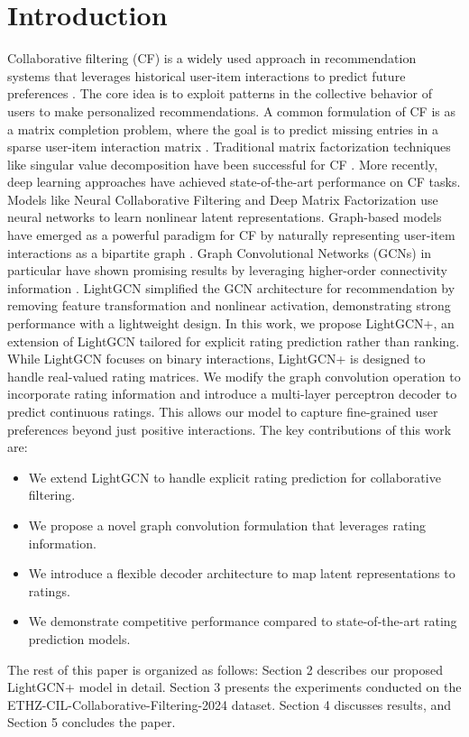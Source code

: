 \documentclass[10pt,conference,compsocconf]{IEEEtran}
\begin{document}
\section{Introduction}
Collaborative filtering (CF) is a widely used approach in recommendation systems that leverages historical user-item interactions to predict future preferences \cite{koren2009matrix}. The core idea is to exploit patterns in the collective behavior of users to make personalized recommendations. A common formulation of CF is as a matrix completion problem, where the goal is to predict missing entries in a sparse user-item interaction matrix \cite{candès2009exact}.
Traditional matrix factorization techniques like singular value decomposition have been successful for CF \cite{koren2009matrix}. More recently, deep learning approaches have achieved state-of-the-art performance on CF tasks. Models like Neural Collaborative Filtering \cite{he2017neural} and Deep Matrix Factorization \cite{xue2017deep} use neural networks to learn nonlinear latent representations.
Graph-based models have emerged as a powerful paradigm for CF by naturally representing user-item interactions as a bipartite graph \cite{berg2017graph}. Graph Convolutional Networks (GCNs) in particular have shown promising results by leveraging higher-order connectivity information \cite{ying2018graph}. LightGCN \cite{he2020lightgcn} simplified the GCN architecture for recommendation by removing feature transformation and nonlinear activation, demonstrating strong performance with a lightweight design.
In this work, we propose LightGCN+, an extension of LightGCN tailored for explicit rating prediction rather than ranking. While LightGCN focuses on binary interactions, LightGCN+ is designed to handle real-valued rating matrices. We modify the graph convolution operation to incorporate rating information and introduce a multi-layer perceptron decoder to predict continuous ratings. This allows our model to capture fine-grained user preferences beyond just positive interactions.
The key contributions of this work are:
\begin{itemize}
\item We extend LightGCN to handle explicit rating prediction for collaborative filtering.
\item We propose a novel graph convolution formulation that leverages rating information.
\item We introduce a flexible decoder architecture to map latent representations to ratings.
\item We demonstrate competitive performance compared to state-of-the-art rating prediction models.
\end{itemize}
The rest of this paper is organized as follows: Section 2 describes our proposed LightGCN+ model in detail. Section 3 presents the experiments conducted on the ETHZ-CIL-Collaborative-Filtering-2024 dataset. 
Section 4 discusses results, and Section 5 concludes the paper.
\end{document}
